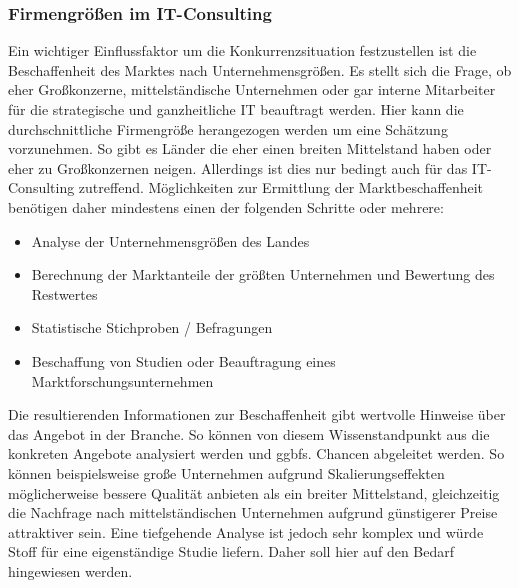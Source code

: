  \subsubsection{Firmengrößen im IT-Consulting}
Ein wichtiger Einflussfaktor um die Konkurrenzsituation festzustellen ist die Beschaffenheit des Marktes nach Unternehmensgrößen.
 Es stellt sich die Frage, ob eher Großkonzerne, mittelständische Unternehmen oder gar interne Mitarbeiter für die strategische und ganzheitliche IT beauftragt werden.
 Hier kann die durchschnittliche Firmengröße herangezogen werden um eine Schätzung vorzunehmen. So gibt es Länder die eher einen breiten Mittelstand haben oder eher zu Großkonzernen neigen. 
 Allerdings ist dies nur bedingt auch für das IT-Consulting zutreffend. 
Möglichkeiten zur Ermittlung der Marktbeschaffenheit benötigen daher mindestens einen der folgenden Schritte oder mehrere:
\begin{itemize}
\item Analyse der Unternehmensgrößen des Landes
\item Berechnung der Marktanteile der größten Unternehmen und Bewertung des Restwertes
\item Statistische Stichproben / Befragungen
\item Beschaffung von Studien oder Beauftragung eines Marktforschungsunternehmen
\end{itemize}
Die resultierenden Informationen zur Beschaffenheit gibt wertvolle Hinweise über das Angebot in der Branche. 
So können von diesem Wissenstandpunkt aus die konkreten Angebote analysiert werden und ggbfs. Chancen abgeleitet werden. 
So können beispielsweise große Unternehmen aufgrund Skalierungseffekten möglicherweise bessere Qualität anbieten als ein breiter Mittelstand, gleichzeitig die Nachfrage nach mittelständischen Unternehmen aufgrund günstigerer Preise attraktiver sein. 
Eine tiefgehende Analyse ist jedoch sehr komplex und würde Stoff für eine eigenständige Studie liefern. Daher soll hier auf den Bedarf hingewiesen werden.


